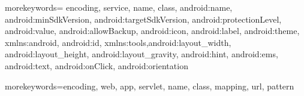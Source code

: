  {
 morekeywords={
  encoding, service, name, class,
  android:name, android:minSdkVersion, android:targetSdkVersion, android:protectionLevel, android:value, android:allowBackup, android:icon, android:label, android:theme, xmlns:android, android:id, xmlns:tools,android:layout_width, android:layout_height, android:layout_gravity, android:hint, android:ems, android:text, android:onClick, android:orientation}
 }
 

 {
  morekeywords={encoding, web, app, servlet, name, class, mapping, url, pattern}
}

